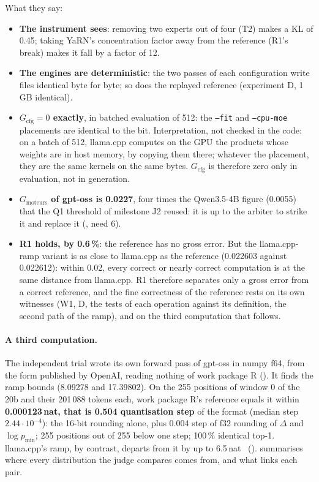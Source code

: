 What they say:
\begin{itemize}
\item \textbf{The instrument sees}: removing two experts out of four (T2) makes a KL of 0.45; taking YaRN's concentration factor away from the reference (R1's break) makes it fall by a factor of 12.
\item \textbf{The engines are deterministic}: the two passes of each configuration write files identical byte for byte; so does the replayed reference (experiment D, 1\,GB identical).
\item \textbf{$G_{\text{cfg}} = 0$ exactly}, in batched evaluation of 512: the \texttt{--fit} and \texttt{--cpu-moe} placements are identical to the bit. Interpretation, not checked in the code: on a batch of 512, llama.cpp computes on the GPU the products whose weights are in host memory, by copying them there; whatever the placement, they are the same kernels on the same bytes. $G_{\text{cfg}}$ is therefore zero only in evaluation, not in generation.
\item \textbf{$G_{\text{moteurs}}$ of gpt-oss is 0.0227}, four times the Qwen3.5-4B figure (0.0055) that the Q1 threshold of milestone J2 reused: it is up to the arbiter to strike it and replace it (, need 6).
\item \textbf{R1 holds, by 0.6\,\%}: the reference has no gross error. But the llama.cpp-ramp variant is as close to llama.cpp as the reference (0.022603 against 0.022612): within 0.02, every correct or nearly correct computation is at the same distance from llama.cpp. R1 therefore separates only a gross error from a correct reference, and the fine correctness of the reference rests on its own witnesses (W1, D, the tests of each operation against its definition, the second path of the ramp), and on the third computation that follows.
\end{itemize}

\paragraph{A third computation.} The independent trial wrote its own forward pass of gpt-oss in numpy f64, from the form published by OpenAI, reading nothing of work package R (). It finds the ramp bounds (8.09278 and 17.39802). On the 255 positions of window 0 of the 20b and their 201\,088 tokens each, work package R's reference equals it within \textbf{0.000123\,nat, that is 0.504 quantisation step} of the format (median step $2.44\cdot10^{-4}$): the 16-bit rounding alone, plus 0.004 step of f32 rounding of $\Delta$ and $\log p_{\min}$; 255 positions out of 255 below one step; 100\,\% identical top-1. llama.cpp's ramp, by contrast, departs from it by up to 6.5\,nat \mes~().  summarises where every distribution the judge compares comes from, and what links each pair.

